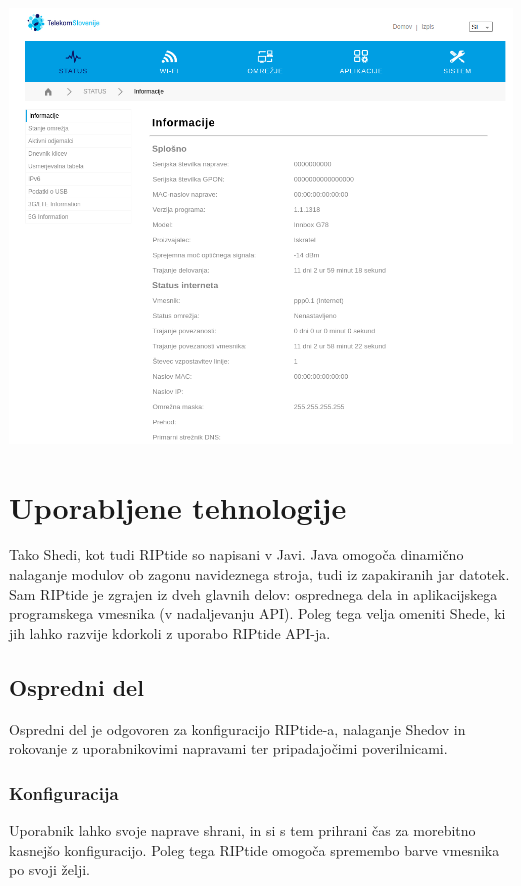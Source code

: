 \documentclass[12pt]{article}
\begin{document}
\begin{center}
	\includegraphics[scale=0.5]{slike/telekom.png}
\end{center}
\newpage

\section{Uporabljene tehnologije}
Tako Shedi, kot tudi RIPtide so napisani v Javi. Java omogoča dinamično
nalaganje modulov ob zagonu navideznega stroja, tudi iz zapakiranih jar
datotek. Sam RIPtide je zgrajen iz dveh glavnih delov: osprednega dela 
in aplikacijskega programskega vmesnika (v nadaljevanju API).
Poleg tega velja omeniti Shede, ki jih lahko razvije kdorkoli z uporabo
RIPtide API-ja.

\subsection{Ospredni del}
Ospredni del je odgovoren za konfiguracijo RIPtide-a, nalaganje Shedov
in rokovanje z uporabnikovimi napravami ter pripadajočimi poverilnicami.

\subsubsection{Konfiguracija}
Uporabnik lahko svoje naprave shrani, in si s tem prihrani čas za morebitno
kasnejšo konfiguracijo. Poleg tega RIPtide omogoča spremembo barve vmesnika
po svoji želji.
\end{document}
